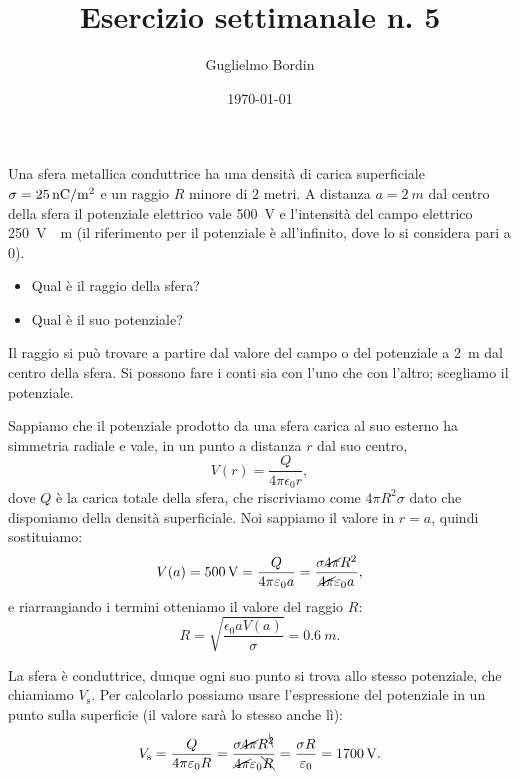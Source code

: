 \documentclass[10pt]{gulartcl}
\title{Esercizio settimanale n. 5}
\author{Guglielmo Bordin}
\date{\today}
\begin{document}
\maketitle

\noindent
Una sfera metallica conduttrice ha una densità di carica superficiale
$\sigma = \qty{25}{nC\per m\squared}$ e un raggio $R$ minore di $2$ metri.
A distanza $a = \qty{2}{m}$ dal centro della sfera il potenziale elettrico
vale \qty{500}{V} e l’intensità del campo elettrico \qty{250}{V \per m} (il
riferimento per il potenziale è all’infinito, dove lo si considera pari a
$0$).

\begin{itemize}
    \item Qual è il raggio della sfera?
    \item Qual è il suo potenziale?
\end{itemize}

\begin{solution}
Il raggio si può trovare a partire dal valore del campo o del potenziale a
\qty{2}{m} dal centro della sfera. Si possono fare i conti sia con l’uno
che con l’altro; scegliamo il potenziale.

Sappiamo che il potenziale prodotto da una sfera carica al suo esterno ha
simmetria radiale e vale, in un punto a distanza $r$ dal suo centro,
\begin{equation}
    V(r) = \frac{Q}{4\pi\epsilon_0 r},
\end{equation}
dove $Q$ è la carica totale della sfera, che riscriviamo come $4\pi R^2 \sigma$
dato che disponiamo della densità superficiale. Noi sappiamo il valore in
$r = a$, quindi sostituiamo:
\begin{equation}
    V(a) = \qty{500}{V} = \frac{Q}{4\pi\varepsilon_0 a} =
    \frac{\sigma\cancel{4 \pi} R^2}{\cancel{4\pi} \varepsilon_0 a},
\end{equation}
e riarrangiando i termini otteniamo il valore del raggio $R$:
\begin{equation}
    R = \sqrt{\frac{\epsilon_0 a V(a)}{\sigma}} = \qty{0.6}{m}.
\end{equation}

La sfera è conduttrice, dunque ogni suo punto si trova allo stesso
potenziale, che chia\-mia\-mo $V_{\mathrm{s}}$. Per calcolarlo possiamo usare
l’espressione del potenziale in un punto sulla superficie (il valore sarà
lo stesso anche lì):
\begin{equation}
    V_{\mathrm{s}} = \frac{Q}{4\pi\varepsilon_0 R} = \frac{\sigma \cancel{4\pi}
    R^{\bcancel{2}}}{\cancel{4\pi}\varepsilon_0 \bcancel{R}} = \frac{\sigma
    R}{\varepsilon_0} = \qty{1700}{V}.
\end{equation}
\end{solution}
\end{document}
